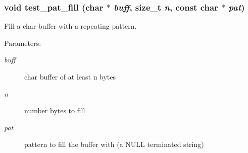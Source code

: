 \subsubsection{\setlength{\rightskip}{0pt plus 5cm}void test\_\-pat\_\-fill (char $\ast$ {\em buff}, size\_\-t {\em n}, const char $\ast$ {\em pat})}\label{test__utils_8h_a52}


Fill a char buffer with a repeating pattern.

\begin{Desc}
\item[Parameters: ]\par
\begin{description}
\item[{\em 
buff}]char buffer of at least n bytes \item[{\em 
n}]number bytes to fill \item[{\em 
pat}]pattern to fill the buffer with (a NULL terminated string) \end{description}
\end{Desc}
